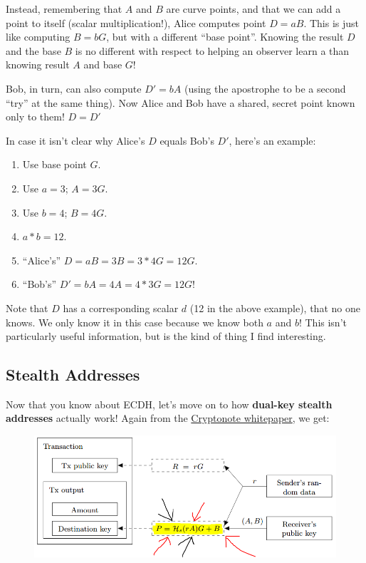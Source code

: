 	Instead, remembering that \(A\) and \(B\) are curve points, and that we can add a point to itself (scalar multiplication!), Alice computes point \(D = aB\). This is just like computing \(B= bG\), but with a different ``base point''. Knowing the result \(D\) and the base \(B\) is no different with respect to helping an observer learn a than knowing result \(A\) and base \(G\)!\par

	Bob, in turn, can also compute \(D' = bA\) (using the apostrophe to be a second ``try'' at the same thing). Now Alice and Bob have a shared, secret point known only to them! \(D = D'\)\par

	In case it isn't clear why Alice's \(D\) equals Bob's \(D'\), here's an example:
	\begin{enumerate}
		\item Use base point \(G\).
		\item Use \(a = 3\); \(A = 3G\).
		\item Use \(b = 4\); \(B = 4G\).
		\item \(a * b = 12\).
		\item ``Alice's'' \(D = aB = 3B = 3*4G = 12G\).
		\item ``Bob's'' \(D' = bA = 4A = 4*3G = 12G\)!
	\end{enumerate}
	Note that \(D\) has a corresponding scalar \(d\) (12 in the above example), that no one knows. We only know it in this case because we know both \(a\) and \(b\)! This isn't particularly useful information, but is the kind of thing I find interesting.

\subsection{Stealth Addresses}
Now that you know about ECDH, let's move on to how \textbf{dual-key stealth addresses} actually work! Again from the \href{https://cryptonote.org/whitepaper.pdf}{Cryptonote whitepaper}, we get:
\begin{figure}[H]
	\centering
	\includegraphics[width=0.8\linewidth]{./images/blog-series/xmr-crypto-luigi1111/stealth-address-cryptenote.png}
\end{figure}

